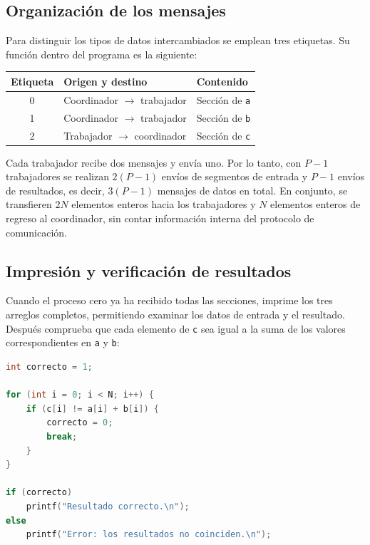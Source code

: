\documentclass[12pt,a4paper]{article}
\begin{document}
\subsection{Organización de los mensajes}

Para distinguir los tipos de datos intercambiados se emplean tres etiquetas.
Su función dentro del programa es la siguiente:

\begin{center}
\begin{tabular}{|c|l|l|}
\hline
\textbf{Etiqueta} & \textbf{Origen y destino} & \textbf{Contenido} \\
\hline
0 & Coordinador $\rightarrow$ trabajador & Sección de \texttt{a} \\
\hline
1 & Coordinador $\rightarrow$ trabajador & Sección de \texttt{b} \\
\hline
2 & Trabajador $\rightarrow$ coordinador & Sección de \texttt{c} \\
\hline
\end{tabular}
\end{center}

Cada trabajador recibe dos mensajes y envía uno. Por lo tanto, con \(P-1\)
trabajadores se realizan \(2(P-1)\) envíos de segmentos de entrada y
\(P-1\) envíos de resultados, es decir, \(3(P-1)\) mensajes de datos en total.
En conjunto, se transfieren \(2N\) elementos enteros hacia los trabajadores
y \(N\) elementos enteros de regreso al coordinador, sin contar información
interna del protocolo de comunicación.

\subsection{Impresión y verificación de resultados}

Cuando el proceso cero ya ha recibido todas las secciones, imprime los tres
arreglos completos, permitiendo examinar los datos de entrada y el resultado.
Después comprueba que cada elemento de \texttt{c} sea igual a la suma de los
valores correspondientes en \texttt{a} y \texttt{b}:

\begin{lstlisting}[language=C]
int correcto = 1;

for (int i = 0; i < N; i++) {
    if (c[i] != a[i] + b[i]) {
        correcto = 0;
        break;
    }
}

if (correcto)
    printf("Resultado correcto.\n");
else
    printf("Error: los resultados no coinciden.\n");
\end{lstlisting}
\end{document}
